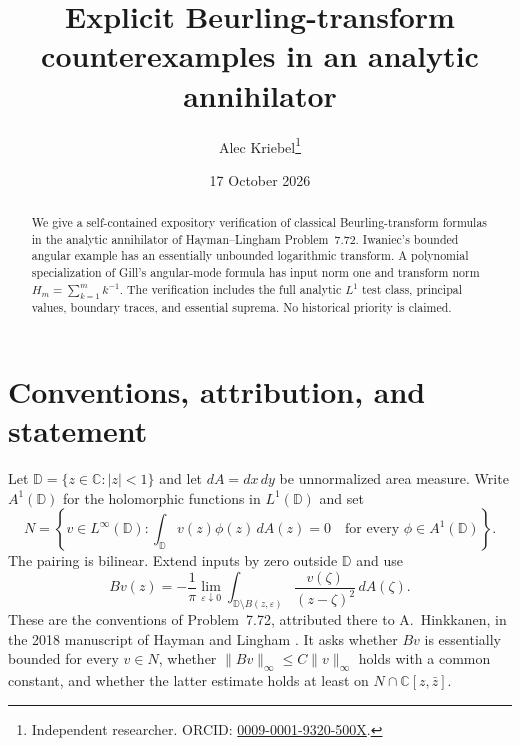 \documentclass[10pt]{article}
\title{Explicit Beurling-transform counterexamples in an analytic annihilator}
\author{Alec Kriebel\thanks{Independent researcher. ORCID: \href{https://orcid.org/0009-0001-9320-500X}{0009-0001-9320-500X}.}}
\date{17 October 2026}
\newcommand{\C}{\mathbb C}
\newcommand{\D}{\mathbb D}
\newcommand{\dd}{\,dA}
\begin{document}
\maketitle
\begin{abstract}
We give a self-contained expository verification of classical Beurling-transform
formulas in the analytic annihilator of Hayman--Lingham Problem~7.72.
Iwaniec's bounded angular example has an essentially unbounded logarithmic
transform. A polynomial specialization of Gill's angular-mode formula has
input norm one and transform norm $H_m=\sum_{k=1}^m k^{-1}$.
The verification includes the full analytic $L^1$ test class, principal values,
boundary traces, and essential suprema. No historical priority is claimed.
\end{abstract}

\section{Conventions, attribution, and statement}
Let $\D=\{z\in\C:|z|<1\}$ and let $dA=dx\,dy$ be unnormalized area measure.
Write $A^1(\D)$ for the holomorphic functions in $L^1(\D)$ and set
\begin{equation}\label{eq:N}
 N=\left\{v\in L^\infty(\D):
       \int_{\D}v(z)\phi(z)\dd(z)=0\quad\text{for every }\phi\in A^1(\D)\right\}.
\end{equation}
The pairing is bilinear. Extend inputs by zero outside $\D$ and use
\begin{equation}\label{eq:B}
 Bv(z)=-\frac1\pi\lim_{\varepsilon\downarrow0}
       \int_{\D\setminus B(z,\varepsilon)}
          \frac{v(\zeta)}{(z-\zeta)^2}\dd(\zeta).
\end{equation}
These are the conventions of Problem~7.72, attributed there to A.~Hinkkanen,
in the 2018 manuscript of Hayman and Lingham \cite[p.~183]{HL18}.
It asks whether $Bv$ is essentially bounded for every $v\in N$, whether
$\|Bv\|_\infty\le C\|v\|_\infty$ holds with a common constant, and whether
the latter estimate holds at least on $N\cap\C[z,\bar z]$.
\end{document}
